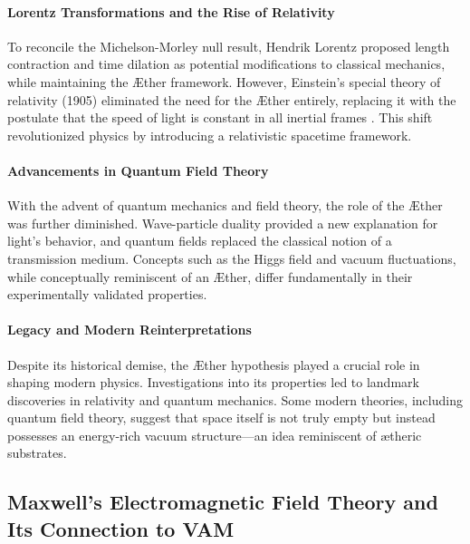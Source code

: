 \documentclass[a4paper,10pt]{article}
\begin{document}
    \paragraph*{Lorentz Transformations and the Rise of Relativity}
    To reconcile the Michelson-Morley null result, Hendrik Lorentz proposed length contraction and time dilation as potential modifications to classical mechanics, while maintaining the Æther framework. However, Einstein's special theory of relativity (1905) eliminated the need for the Æther entirely, replacing it with the postulate that the speed of light is constant in all inertial frames \cite{einstein1905}. This shift revolutionized physics by introducing a relativistic spacetime framework.

    \paragraph*{Advancements in Quantum Field Theory}
    With the advent of quantum mechanics and field theory, the role of the Æther was further diminished. Wave-particle duality provided a new explanation for light's behavior, and quantum fields replaced the classical notion of a transmission medium. Concepts such as the Higgs field \cite{higgs1964} and vacuum fluctuations, while conceptually reminiscent of an Æther, differ fundamentally in their experimentally validated properties.

    \paragraph*{Legacy and Modern Reinterpretations}
    Despite its historical demise, the Æther hypothesis played a crucial role in shaping modern physics. Investigations into its properties led to landmark discoveries in relativity and quantum mechanics. Some modern theories, including quantum field theory, suggest that space itself is not truly empty but instead possesses an energy-rich vacuum structure—an idea reminiscent of ætheric substrates.

    \subsection{Maxwell's Electromagnetic Field Theory and Its Connection to VAM}
\end{document}
